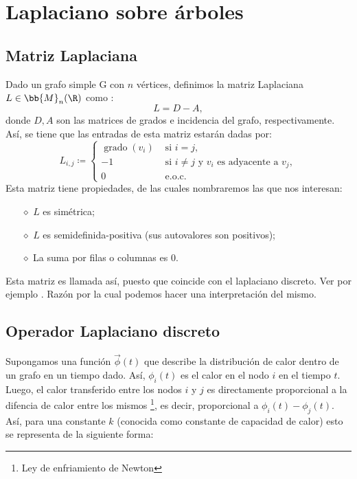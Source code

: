 \chapter{Laplaciano sobre árboles}
\label{chapter_3}

\section{Matriz Laplaciana}
Dado un grafo simple G con $n$ vértices, definimos la matriz Laplaciana $L\in \bb{M}_n(\R)$ como :
$$ L = D-A,$$
donde $D,A$ son las matrices de grados e incidencia del grafo, respectivamente. Así, se tiene que las entradas de esta matriz estarán dadas por:
$$
L_{i, j}\coloneqq \left\{\begin{array}{ll}
\operatorname{grado}\left(v_{i}\right) & \text { si } i=j, \\
-1 & \text { si } i \neq j \text { y } v_{i} \text { es adyacente a } v_{j}, \\
0 & \text { e.o.c. }
\end{array}\right.$$
Esta matriz tiene propiedades, de las cuales nombraremos  las que nos interesan:
\begin{itemize}
	\item[$\diamond$] $L$ es simétrica;
	\item[$\diamond$] $L$ es semidefinida-positiva (sus autovalores son positivos);
	\item[$\diamond$] La suma por filas o columnas es $0$.
\end{itemize}
Esta matriz es llamada así, puesto que coincide con el laplaciano discreto. Ver por ejemplo \cite{networksAI}. Razón por la cual podemos hacer una interpretación del mismo.

\section{Operador Laplaciano discreto}
Supongamos una función $\vec{\phi}(t)$ que describe la distribución de calor dentro de un grafo en un tiempo dado. Así, $\phi_i(t)$ es el calor en el nodo $i$ en el tiempo $t$. Luego, el calor transferido entre los nodos $i$ y $j$ es directamente proporcional a la difencia de calor entre los mismos \footnote{Ley de enfriamiento de Newton}, es decir, proporcional a $\phi_i(t)-\phi_j(t)$. Así, para una constante $k$ (conocida como constante de capacidad de calor) esto se representa de la siguiente forma:

